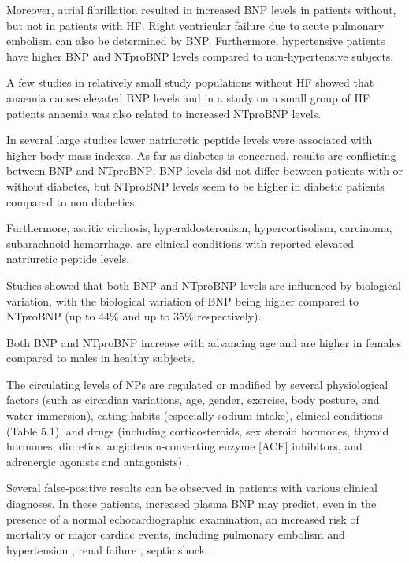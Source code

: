\documentclass[14pt,a4paper,onecolumn]{extarticle}
\begin{document}
Moreover, atrial fibrillation resulted in increased BNP levels in patients without, but not in patients with HF. \citep{Knudsen2005} Right ventricular failure due to acute pulmonary embolism can also be determined by BNP. \citep{Tulevski2002} Furthermore, hypertensive patients have higher BNP and NTproBNP levels compared to non-hypertensive subjects. \citep{Boomsma2001}

A few studies in relatively small study populations without HF showed that anaemia causes elevated BNP levels \citep{Tsuji2004} \citep{Willis2005} \citep{Wold2005} and in a study on a small group of HF patients anaemia was also related to increased NTproBNP levels. \citep{Wu2005}

In several large studies lower natriuretic peptide levels were associated with higher body mass indexes. \citep{Das2005} \citep{Krauser2005} \citep{Mehra2004} \citep{Wang2004b} As far as diabetes is concerned, results are conflicting between BNP and NTproBNP; BNP levels did not differ between patients with or without diabetes, \citep{Wu2004} but NTproBNP levels seem to be higher in diabetic patients compared to non diabetics. \citep{Magnusson2004}

Furthermore, ascitic cirrhosis, hyperaldosteronism, hypercortisolism, carcinoma, subarachnoid hemorrhage, \citep{Pfister2004} are clinical conditions with reported elevated natriuretic peptide levels.

Studies showed that both BNP and NTproBNP levels are influenced by biological variation, with the biological variation of BNP being higher compared to NTproBNP (up to 44\% and up to 35\% respectively). \citep{Bruins2004} \citep{Wu2003b}

Both BNP and NTproBNP increase with advancing age and are higher in females compared to males in healthy subjects. \citep{Raymond2003}

The circulating levels of NPs are regulated or modified by several physiological factors (such as circadian variations, age, gender, exercise, body posture, and water immersion), eating habits (especially sodium intake), clinical conditions (Table 5.1), and drugs (including corticosteroids, sex steroid hormones, thyroid hormones, diuretics, angiotensin-converting enzyme [ACE] inhibitors, and adrenergic agonists and antagonists) \citep{bib31} \citep{bib32} \citep{bib33} \citep{bib34} \citep{bib35} \citep{bib36}.

Several false-positive results can be observed in patients with various clinical diagnoses. In these patients, increased plasma BNP may predict, even in the presence of a normal echocardiographic examination, an increased risk of mortality or major cardiac events, including pulmonary embolism \citep{121} \citep{123} \citep{bib382} and hypertension \citep{bib383}, renal failure \citep{bib384} \citep{bib385}, septic shock \citep{bib386}.
\end{document}
